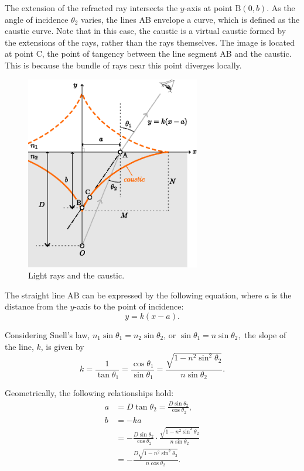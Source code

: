 \documentclass[twocolumn]{article}
\begin{document}
The extension of the refracted ray intersects the $y$-axis at point $\mathrm{B}(0, b)$. As the angle of incidence $\theta_2$ varies, the lines AB envelope a curve, which is defined as the caustic curve. Note that in this case, the caustic is a virtual caustic formed by the extensions of the rays, rather than the rays themselves. The image is located at point $\mathrm{C}$, the point of tangency between the line segment AB and the caustic. This is because the bundle of rays near this point diverges locally.

\begin{figure}
	\centering
	\includegraphics[width=3in]{figs/g237.eps}
	\caption{Light rays and the caustic.}
	\label{fig:geometry}
\end{figure}

The straight line $\mathrm{AB}$ can be expressed by the following equation, where $a$ is the distance from the $y$-axis to the point of incidence:
$$y=k(x-a).$$

Considering Snell's law, $ {n_1} \sin\theta_1 = {n_2} \sin\theta_2$, or $ \sin\theta_1 = n\sin\theta_2,$
the slope of the line, $k$, is given by
$$k=\dfrac{1}{\tan\theta_1}=\dfrac{\cos\theta_1}{\sin\theta_1}
=\dfrac{\sqrt{1-n^2\sin^2\theta_2}}{n\sin\theta_2}.$$

Geometrically, the following relationships hold:
$$\begin{aligned}
	a &= D\tan\theta_2 = \frac{D\sin\theta_2}{\cos\theta_2},\\
	b &= -ka \\
	&= -\frac{D\sin\theta_2}{\cos\theta_2} \cdot \frac{\sqrt{1-n^2\sin^2\theta_2}}{n\sin\theta_2}\\
	&= -\frac{D\sqrt{1-n^2\sin^2\theta_2}}{n\cos\theta_2}.
\end{aligned}$$
\end{document}
